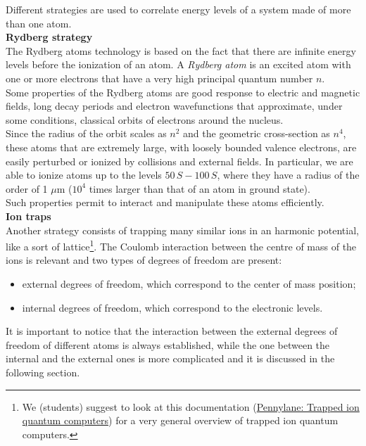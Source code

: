 %
%


Different strategies are used to correlate energy levels of a system made of more than one atom.\\

\noindent \textbf{\sffamily Rydberg strategy}\\

The Rydberg atoms technology is based on the fact that there are infinite energy levels before the ionization of an atom. A \textit{Rydberg atom} is an excited atom with one or more electrons that have a very high principal quantum number $n$.
\\
Some properties of the Rydberg atoms are good response to electric and magnetic fields, long decay periods and electron wavefunctions that approximate, under some conditions, classical orbits of electrons around the nucleus.
\\
Since the radius of the orbit scales as $n^{2}$ and the geometric cross-section as $n^{4}$, these atoms that are extremely large, with loosely bounded valence electrons, are easily perturbed or ionized by collisions and external fields. In particular, we are able to ionize atoms up to the levels $50\,S-100\,S$, where they have a radius of the order of 1 $\mu$m ($10^{4}$ times larger than that of an atom in ground state). 
\\
Such properties permit to interact and manipulate these atoms efficiently. \\

\noindent\textbf{\sffamily Ion traps}\\

Another strategy consists of trapping many similar ions in an harmonic potential, like a sort of lattice\footnote{We (students) suggest to look at this documentation (\href{https://pennylane.ai/qml/demos/tutorial_trapped_ions.html}{Pennylane: Trapped ion quantum computers}) for a very general overview of trapped ion quantum computers.}. The Coulomb interaction between the centre of mass of the ions is relevant and two types of degrees of freedom are present: 
\begin{itemize}
    \setlength\itemsep{1em}
    \item external degrees of freedom, which correspond to the center of mass position; 
    \item internal degrees of freedom, which correspond to the electronic levels. 
\end{itemize}
It is important to notice that the interaction between the external degrees of freedom of different atoms is always established, while the one between the internal and the external ones is more complicated and it is discussed in the following section. 

